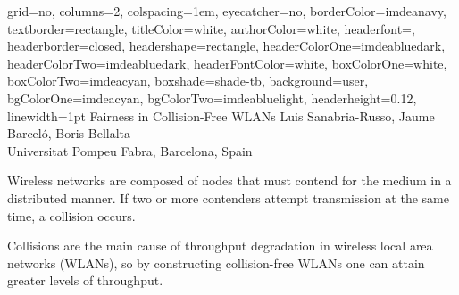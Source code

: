 \documentclass[portrait,a0paper]{baposter}
\begin{document}
\begin{poster}
{
	grid=no,
	columns=2,
	colspacing=1em,
	eyecatcher=no,
	borderColor=imdeanavy,
	textborder=rectangle,
  	titleColor=white,
    	authorColor=white,
	headerfont=\textsf,
	headerborder=closed,
	headershape=rectangle,
	headerColorOne=imdeabluedark,
	headerColorTwo=imdeabluedark,
	headerFontColor=white,
	boxColorOne=white,
	boxColorTwo=imdeacyan,
	boxshade=shade-tb,
	background=user,
	bgColorOne=imdeacyan,
	bgColorTwo=imdeabluelight,
	headerheight=0.12\textheight,
	linewidth=1pt
}
{
}
{Fairness in Collision-Free WLANs}
{
	Luis Sanabria-Russo, Jaume Barcel{\'o}, Boris Bellalta\vspace{0.5em}\\
	\normalsize Universitat Pompeu Fabra, Barcelona, Spain
}

{

Wireless networks are composed of nodes that must contend for the medium in a distributed manner. If two or more contenders attempt transmission at the same time, a collision occurs. %

Collisions are the main cause of throughput degradation in wireless local area networks (WLANs), so by constructing collision-free WLANs one can attain greater levels of throughput.


}

\end{poster}
\end{document}
